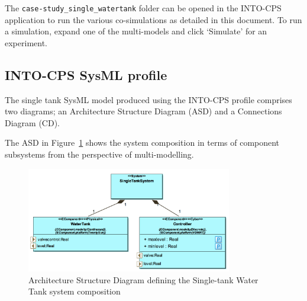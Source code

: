 The \texttt{case-study\_single\_watertank} folder can be opened in the INTO-CPS application to run the various co-simulations as detailed in this document. To run a simulation, expand one of the multi-models and click `Simulate' for an experiment. 

%
%

\subsection{INTO-CPS SysML profile}
\label{sec:singletank_into_sys}

The single tank SysML model produced using the INTO-CPS profile comprises two diagrams; an Architecture Structure Diagram (ASD) and a Connections Diagram (CD). 

The ASD in Figure~\ref{fig:fig:singletankasd} shows the system composition in terms of component subsystems from the perspective of multi-modelling. 

\begin{figure}[htbp]
\begin{center}
\includegraphics[width=0.8\textwidth]{singletank/sysml_asd.png}
\caption{Architecture Structure Diagram defining the Single-tank Water Tank system composition}
\label{fig:fig:singletankasd}
\end{center}
\end{figure}

